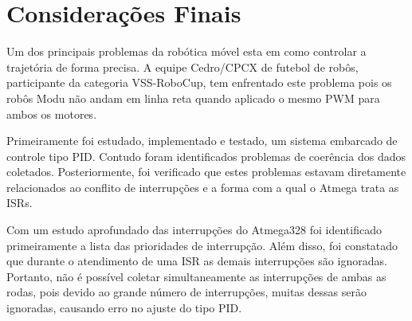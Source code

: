 \documentclass[a4paper,12pt,portuguese]{ufms-cpcx}
\begin{document}

	
	

\chapter{Considerações Finais}
Um dos principais problemas da robótica móvel esta em como controlar a trajetória de forma precisa. A equipe Cedro/CPCX de futebol de robôs, participante da categoria VSS-RoboCup, tem enfrentado este problema pois os robôs Modu não andam em linha reta quando aplicado o mesmo PWM para ambos os motores.

Primeiramente foi estudado, implementado e testado, um sistema embarcado de controle tipo PID. Contudo foram identificados problemas de coerência  dos dados coletados. Posteriormente, foi verificado que estes problemas estavam diretamente relacionados ao conflito de interrupções e a forma com a qual o Atmega trata as ISRs.

Com um estudo aprofundado das interrupções do Atmega328 foi identificado primeiramente a lista das prioridades de interrupção.
Além disso, foi constatado que durante o atendimento de uma ISR as demais interrupções são ignoradas. Portanto, não é possível coletar simultaneamente as interrupções de ambas as rodas, pois devido ao grande número de interrupções, muitas dessas serão ignoradas, causando erro no ajuste do tipo PID.
\end{document}

